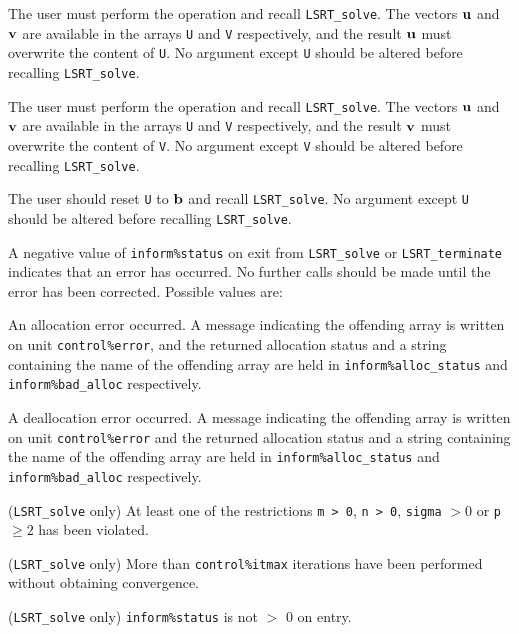 \documentclass{galahad}
\newcommand{\packagename}{LS\-RT}
\begin{document}
\begin{description}

 The user must perform the operation
\disp{\bmu := \bmu + \bmA \bmv,}
and recall {\tt \packagename\_solve}.
The vectors ${\mathbf{u}}$ and ${\mathbf{v}}$ are available in the arrays {\tt U}
and {\tt V} respectively, and the result
${\mathbf{u}}$ must overwrite the content of {\tt U}.
No argument except {\tt U} should be altered before recalling
{\tt \packagename\_solve}.

 The user must perform the operation
and recall {\tt \packagename\_solve}.
The vectors ${\mathbf{u}}$ and ${\mathbf{v}}$ are available in the arrays {\tt U}
and {\tt V} respectively, and the result
${\mathbf{v}}$ must overwrite the content of {\tt V}.
No argument except {\tt V} should be altered before recalling
{\tt \packagename\_solve}.

  The user should reset {\tt U} to ${\mathbf{b}}$ and recall
{\tt \packagename\_solve}.
No argument except {\tt U} should be altered before recalling
{\tt \packagename\_solve}.
\end{description}


\galerrors
A negative value of  {\tt inform\%status} on exit from
{\tt \packagename\_solve}
or
{\tt \packagename\_terminate}
indicates that an error has occurred. No further calls should be made
until the error has been corrected. Possible values are:

\begin{description}
 An allocation error occurred. A message indicating
the offending
array is written on unit {\tt control\%error}, and the returned allocation
status and a string containing the name of the offending array
are held in {\tt inform\%alloc\_\-status}
and {\tt inform\%bad\_alloc} respectively.

 A deallocation error occurred.
A message indicating the offending
array is written on unit {\tt control\%error} and the returned allocation
status and a string containing the name of the offending array
are held in {\tt inform\%alloc\_\-status}
and {\tt inform\%bad\_alloc} respectively.

 ({\tt \packagename\_solve} only)
At least one of the restrictions
{\tt m > 0},
{\tt n > 0},
{\tt sigma} $> 0$
or
{\tt p} $\geq 2$
has been violated.

 ({\tt \packagename\_solve} only) More than
{\tt control\%itmax} iterations have been performed without obtaining
convergence.

 ({\tt \packagename\_solve} only)  {\tt inform\%status} is
not $>$ 0 on entry.

\end{description}
\end{document}
